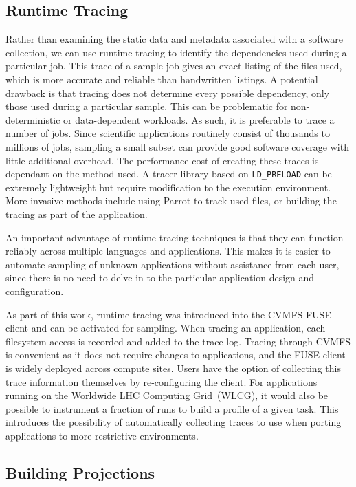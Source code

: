 \documentclass[sigconf]{acmart}
\begin{document}
\subsection{Runtime Tracing}
Rather than examining the static data and metadata associated with a software collection,
we can use runtime tracing to identify the dependencies used during a particular job.
This trace of a sample job gives an exact listing of the files used,
which is more accurate and reliable than handwritten listings.
A potential drawback is that tracing does not determine every possible dependency,
only those used during a particular sample.
This can be problematic for non-deterministic or data-dependent workloads.
As such, it is preferable to trace a number of jobs.
Since scientific applications routinely consist of thousands
to millions of jobs, sampling a small subset
can provide good software coverage with little
additional overhead. %
The performance cost of creating these traces is
dependant on the method used.
A tracer library based on \texttt{LD\_PRELOAD} can be extremely lightweight but require modification to the execution environment.
More invasive methods include using Parrot to track used files, %
or building the tracing as part of the application.

An important advantage of runtime tracing techniques is that they can function reliably across multiple languages and applications.
This makes it is easier to automate sampling of unknown applications without assistance from each user,
since there is no need to delve in to the particular application
design and configuration.

As part of this work, runtime tracing was introduced
into the CVMFS FUSE client and can be activated for sampling.
When tracing an application,
each filesystem access is recorded and added to the trace log.
Tracing through CVMFS is convenient as it does not require changes to applications,
and the FUSE client is widely deployed across compute sites.
Users have the option of collecting this trace information themselves by re-configuring the client.
For applications running on the Worldwide LHC Computing Grid~(WLCG),
it would also be possible to instrument a fraction of runs to build a profile of a given task.
This introduces the possibility of automatically collecting traces to use when porting applications to more restrictive environments.
    
\subsection{Building Projections}
\end{document}
